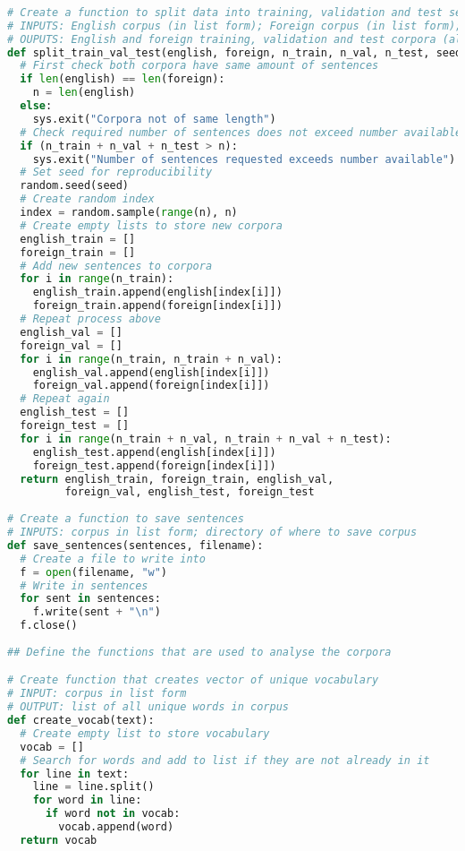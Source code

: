 \documentclass[11pt]{article}
\begin{document}
\begin{lstlisting}[language=Python]
  
# Create a function to split data into training, validation and test sets
# INPUTS: English corpus (in list form); Foreign corpus (in list form); n_train -- number of sentences in training corpus; n_val -- number of sentences in validation corpus; n_test -- number of sentences in test corpus; seed -- random seed for reproducibility
# OUPUTS: English and foreign training, validation and test corpora (all in list form)
def split_train_val_test(english, foreign, n_train, n_val, n_test, seed = 42):
  # First check both corpora have same amount of sentences
  if len(english) == len(foreign):
    n = len(english)
  else:
    sys.exit("Corpora not of same length")
  # Check required number of sentences does not exceed number available
  if (n_train + n_val + n_test > n):
    sys.exit("Number of sentences requested exceeds number available")
  # Set seed for reproducibility
  random.seed(seed)
  # Create random index
  index = random.sample(range(n), n)
  # Create empty lists to store new corpora
  english_train = []
  foreign_train = []
  # Add new sentences to corpora
  for i in range(n_train):
    english_train.append(english[index[i]])
    foreign_train.append(foreign[index[i]])
  # Repeat process above
  english_val = []
  foreign_val = []
  for i in range(n_train, n_train + n_val):
    english_val.append(english[index[i]])
    foreign_val.append(foreign[index[i]])
  # Repeat again
  english_test = []
  foreign_test = []
  for i in range(n_train + n_val, n_train + n_val + n_test):
    english_test.append(english[index[i]])
    foreign_test.append(foreign[index[i]])
  return english_train, foreign_train, english_val, 
         foreign_val, english_test, foreign_test
  
# Create a function to save sentences
# INPUTS: corpus in list form; directory of where to save corpus
def save_sentences(sentences, filename):
  # Create a file to write into
  f = open(filename, "w")
  # Write in sentences
  for sent in sentences:
    f.write(sent + "\n")
  f.close()
  
## Define the functions that are used to analyse the corpora

# Create function that creates vector of unique vocabulary
# INPUT: corpus in list form
# OUTPUT: list of all unique words in corpus
def create_vocab(text):
  # Create empty list to store vocabulary
  vocab = []
  # Search for words and add to list if they are not already in it
  for line in text:
    line = line.split()
    for word in line:
      if word not in vocab:
        vocab.append(word)
  return vocab


\end{lstlisting}
\end{document}
